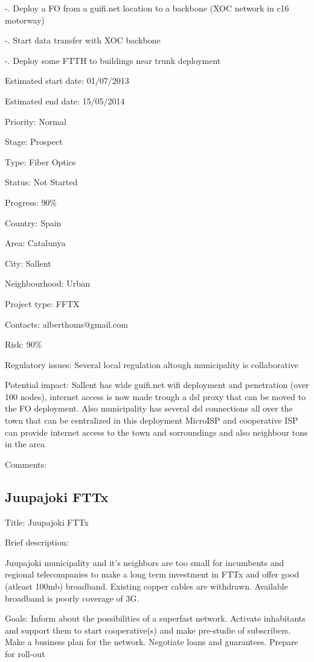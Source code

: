 \documentclass[draftclsnofoot,12pt,journal,onecolumn]{IEEEtran}
\begin{document}
-. Deploy a FO from a guifi.net location to a backbone (XOC network in c16 
motorway) 

-. Start data transfer with XOC backbone 

-. Deploy some FTTH to buildings near trunk deployment 

Estimated start date: 01/07/2013 

Estimated end date: 15/05/2014 

Priority: Normal 

Stage: Prospect 

Type: Fiber Optics 

Status: Not Started 

Progress: 90\% 

Country: Spain 

Area: Catalunya 

City: Sallent 

Neighbourhood: Urban 

Project type: FFTX 

Contacts: alberthoms@gmail.com

Risk: 90\% 

Regulatory issues: Several local regulation altough municipality is 
collaborative 

Potential impact: 
Sallent has wide guifi.net wifi deployment and penetration (over 100 nodes), 
internet access is now made trough a dsl proxy that can be moved to the FO 
deployment. 
Also municipality has several dsl connections all over the town that can be 
centralized in this deployment 
MicroISP and cooperative ISP can provide internet access to the town and 
sorroundings and also neighbour tons in the area 

Comments: 

\subsection{Juupajoki FTTx} 

Title: Juupajoki FTTx 

Brief description: 

Juupajoki municipality and it's neighbors are too small for incumbents and 
regional telecompanies to make a long term investment in FTTx and offer good 
(atleast 100mb) broadband. Existing copper cables are withdrawn. Available 
broadband is poorly coverage of 3G. 

Goals: Inform about the possibilities of a superfast network. Activate 
inhabitants and support them to start cooperative(s) and make pre-studie of 
subscribers. Make a business plan for the network. Negotiate loans and 
guarantees. Prepare for roll-out 
\end{document}

